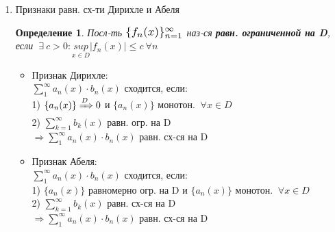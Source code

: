 \documentclass[a4paper, 12pt]{article}
\newtheorem{Definition}{Определение}
\begin{document}
\begin{enumerate}
        \item
        Признаки равн. сх-ти Дирихле и Абеля\\
        \begin{Definition}
            Посл-ть $\scalebox{1.2}{$\{ f_n(x) \}^{\infty}_{n = 1}$}$ наз-ся
            \textbf{равн. ограниченной на D}, если $\ \exists \  c > 0:
            \underset{x \in D}{sup} \left| f_n(x) \right| \le c \ \forall n$
        \end{Definition}
        \begin{itemize}
            \item
                Признак Дирихле:\\
                $\displaystyle \sum^{\infty}_{1} a_n(x) \cdot b_n(x)$
                сходится, если:\\
                1) $\{a_n(x)\} \xRightarrow{D} 0$ и $\{ a_n(x)\}$ монотон.
                $\ \forall x \in D$ \\
                2) $\displaystyle \sum^{\infty}_{k = 1} b_k(x)$ равн. огр. на D\\
                $\Rightarrow \displaystyle \sum^{\infty}_{1} a_n(x)
                \cdot b_n(x)$ равн. сх-ся на D
            \item
                Признак Абеля:\\
                $\displaystyle \sum^{\infty}_{1} a_n(x) \cdot b_n(x)$
                сходится, если:\\
                1) $\{a_n(x)\}$ равномерно огр. на D и $\{ a_n(x)\}$ монотон.
                $\ \forall x \in D$ \\
                2) $\displaystyle \sum^{\infty}_{k = 1} b_k(x)$ равн. сх-ся на D\\
                $\Rightarrow \displaystyle \sum^{\infty}_{1} a_n(x)
                \cdot b_n(x)$ равн. сх-ся на D
        \end{itemize}
    \end{enumerate}
\end{document}
